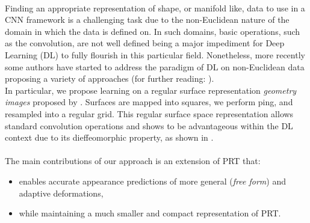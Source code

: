 \\
Finding an appropriate representation of shape, or manifold like, data to use in a CNN framework is a challenging task due to the non-Euclidean nature of the domain in which the data is defined on. In such domains, basic operations, such as the convolution, are not well defined being a major impediment for Deep Learning (DL) to fully flourish in this particular field. Nonetheless, more recently some authors have started to address the paradigm of DL on non-Euclidean data proposing a variety of approaches \cite{Masci2015ShapeNetCN, Geometric_deep_learning, CNN_on_Torus} (for further reading: \cite{GeoDeepLearning}). \\
In particular, we propose learning on a regular surface representation \textit{geometry images} proposed by \citep{gu2002geometry}. Surfaces are mapped into squares, we perform ping, and resampled into a regular grid. This regular surface space representation allows standard convolution operations and shows to be advantageous within the DL context due to its dieffeomorphic property, as shown in \cite{sinha2016deep}. 
\\
\\
The main contributions of our approach is an extension of PRT that:
\begin{itemize}
\item enables accurate appearance predictions of more general (\textit{free form}) and adaptive deformations,
\item while maintaining a much smaller and compact representation of PRT. 
\end{itemize}
